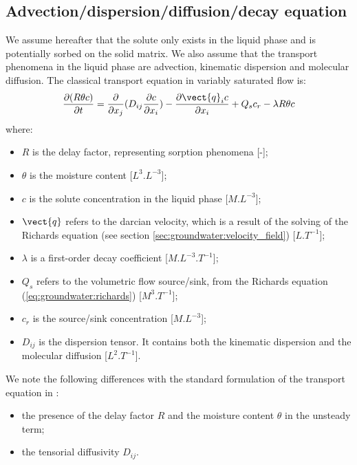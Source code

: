 \subsection{Advection/dispersion/diffusion/decay equation}
\hypertarget{gwf_sp_transp}{}
We assume hereafter that the solute only exists in the liquid phase and is
potentially sorbed on the solid matrix.
We also assume that the transport phenomena in the liquid phase are advection, kinematic dispersion and molecular diffusion.
The classical transport equation in variably saturated flow is:
\begin{equation}
\label{eq:groundwater:edv_disp_diff_ini}
\frac{\partial(R \theta c)}{\partial{t}}=\frac{\partial}{\partial x_j}(D_{ij} \frac{\partial c}{\partial x_i})-\frac{\partial \vect{q}_i c}{\partial x_i} + Q_s c_r - \lambda R \theta c
\end{equation}
where:
\begin {itemize}
 \item[$\bullet$] $R$ is the delay factor, representing sorption phenomena [-];
 \item[$\bullet$] $\theta$ is the moisture content [$L^3.L^{-3}$];
 \item[$\bullet$] $c$ is the solute concentration in the liquid phase [$M.L^{-3}$];
 \item[$\bullet$] $\vect{q}$ refers to the darcian velocity, which is a result of the solving of the Richards equation (see section \ref{sec:groundwater:velocity_field}) [$L.T^{-1}$];
 \item[$\bullet$] $\lambda$ is a first-order decay coefficient [$M.L^{-3}.T^{-1}$];
 \item[$\bullet$] $Q_s$ refers to the volumetric flow source/sink, from the Richards equation (\ref{eq:groundwater:richards}) [$M^3.T^{-1}$];
 \item[$\bullet$] $c_r$ is the source/sink concentration [$M.L^{-3}$];
 \item[$\bullet$] $D_{ij}$ is the dispersion tensor. It contains both the kinematic dispersion and the molecular diffusion [$L^2.T^{-1}$].
\end{itemize}
We note the following differences with the standard formulation of the transport equation in \CS:
\begin {itemize}
 \item[$\bullet$] the presence of the delay factor $R$ and the moisture content $\theta$ in the unsteady term;
 \item[$\bullet$] the tensorial diffusivity $D_{ij}$.
\end{itemize}

